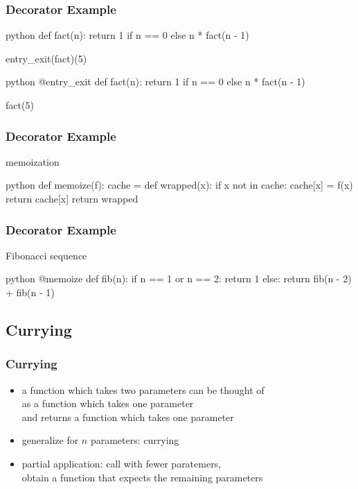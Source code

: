 \documentclass[dvipsnames]{beamer}
\theoremstyle{plain}
\begin{document}
\begin{frame}[fragile]
  \frametitle{Decorator Example}

  \begin{exampleblock}{}
    \begin{pygments}{python}
def fact(n):
    return 1 if n == 0 else n * fact(n - 1)

entry_exit(fact)(5)
    \end{pygments}

    \pause
    \medskip
    \begin{pygments}{python}
@entry_exit
def fact(n):
    return 1 if n == 0 else n * fact(n - 1)

fact(5)
    \end{pygments}
  \end{exampleblock}
\end{frame}

\begin{frame}[fragile]
  \frametitle{Decorator Example}

  \begin{exampleblock}{memoization}
    \begin{pygments}{python}
def memoize(f):
    cache = {}
    def wrapped(x):
        if x not in cache:
            cache[x] = f(x)
        return cache[x]
    return wrapped
    \end{pygments}
  \end{exampleblock}
\end{frame}

\begin{frame}[fragile]
  \frametitle{Decorator Example}

  \begin{exampleblock}{Fibonacci sequence}
    \begin{pygments}{python}
@memoize
def fib(n):
    if n == 1 or n == 2:
        return 1
    else:
        return fib(n - 2) + fib(n - 1)
    \end{pygments}
  \end{exampleblock}
\end{frame}

\subsection{Currying}

\begin{frame}
  \frametitle{Currying}

  \begin{itemize}
    \item a function which takes two parameters can be thought of\\
      as a function which takes one parameter\\
      and returns a function which takes one parameter
    \item generalize for $n$ parameters: \alert{currying}

    \pause
    \bigskip
    \item \alert{partial application}: call with fewer paratemers,\\
      obtain a function that expects the remaining parameters
  \end{itemize}
\end{frame}
\end{document}
